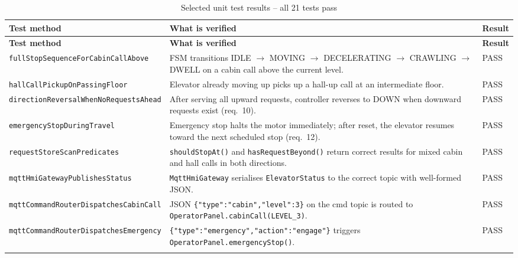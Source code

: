 \documentclass[12pt,a4paper]{article}
\begin{document}
\begin{longtable}{@{}p{5cm}p{7cm}p{1.8cm}@{}}
\toprule
\textbf{Test method} & \textbf{What is verified} & \textbf{Result} \\
\midrule
\endfirsthead
\toprule
\textbf{Test method} & \textbf{What is verified} & \textbf{Result} \\
\midrule
\endhead
\endfoot
\bottomrule
\endlastfoot

\texttt{fullStopSequence\-ForCabinCallAbove}
  & FSM transitions IDLE $\to$ MOVING $\to$ DECELERATING $\to$ CRAWLING $\to$ DWELL
    on a cabin call above the current level.
  & PASS \\[4pt]

\texttt{hallCallPickupOn\-PassingFloor}
  & Elevator already moving up picks up a hall-up call at an intermediate floor.
  & PASS \\[4pt]

\texttt{directionReversal\-WhenNoRequestsAhead}
  & After serving all upward requests, controller reverses to DOWN when
    downward requests exist (req.~10).
  & PASS \\[4pt]

\texttt{emergencyStop\-DuringTravel}
  & Emergency stop halts the motor immediately; after reset, the elevator
    resumes toward the next scheduled stop (req.~12).
  & PASS \\[4pt]

\texttt{requestStoreScan\-Predicates}
  & \texttt{shouldStopAt()} and \texttt{hasRequestBeyond()} return correct
    results for mixed cabin and hall calls in both directions.
  & PASS \\[4pt]

\texttt{mqttHmiGateway\-PublishesStatus}
  & \texttt{MqttHmiGateway} serialises \texttt{ElevatorStatus} to the correct
    topic with well-formed JSON.
  & PASS \\[4pt]

\texttt{mqttCommandRouter\-DispatchesCabinCall}
  & JSON \texttt{\{"type":"cabin","level":3\}} on the cmd topic is routed
    to \texttt{OperatorPanel.cabinCall(LEVEL\_3)}.
  & PASS \\[4pt]

\texttt{mqttCommandRouter\-DispatchesEmergency}
  & \texttt{\{"type":"emergency","action":"engage"\}} triggers
    \texttt{OperatorPanel.emergencyStop()}.
  & PASS \\

\caption{Selected unit test results -- all 21 tests pass}
\end{longtable}
\end{document}
